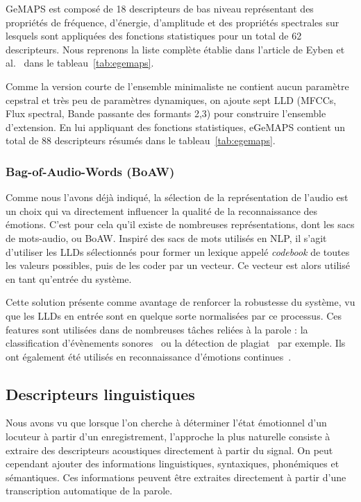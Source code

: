 GeMAPS est composé de 18 descripteurs de bas niveau représentant des propriétés de fréquence, d’énergie, d’amplitude et des propriétés spectrales sur lesquels sont appliquées des fonctions statistiques pour un total de 62 descripteurs.
Nous reprenons la liste complète établie dans l'article de Eyben et al.~\cite{Eyben2016} dans le tableau~\ref{tab:egemaps}.



Comme la version courte de l’ensemble minimaliste ne contient aucun paramètre cepstral et très peu de paramètres dynamiques, on ajoute sept LLD (MFCCs, Flux spectral, Bande passante des formants 2,3) pour construire l'ensemble d'extension. En lui appliquant des fonctions statistiques, eGeMAPS contient un total de 88 descripteurs résumés dans le tableau~\ref{tab:egemaps}.

\subsubsection{Bag-of-Audio-Words (BoAW)}
Comme nous l'avons déjà indiqué, la sélection de la représentation de l'audio est un choix qui va directement influencer la qualité de la reconnaissance des émotions. C'est pour cela qu'il existe de nombreuses représentations, dont les sacs de mots-audio, ou BoAW. Inspiré des sacs de mots utilisés en NLP, il s'agit d'utiliser les LLDs sélectionnés pour former un lexique appelé \textit{codebook} de toutes les valeurs possibles, puis de les coder par un vecteur. Ce vecteur est alors utilisé en tant qu'entrée du système.

Cette solution présente comme avantage de renforcer la robustesse du système, vu que les LLDs en entrée sont en quelque sorte normalisées par ce processus. Ces features sont utilisées dans de nombreuses tâches reliées à la parole : la classification d'évènements sonores~\cite{Pancoast2012,Schmitt2016} ou la détection de plagiat~\cite{Liu2010} par exemple. Ils ont également été utilisés en reconnaissance d'émotions continues~\cite{Schmitt2016,Han2018}. %

\subsection{Descripteurs linguistiques}
Nous avons vu que lorsque l'on cherche à déterminer l'état émotionnel d'un locuteur à partir d'un enregistrement, l'approche la plus naturelle consiste à extraire des descripteurs acoustiques directement à partir du signal. On peut cependant ajouter des informations linguistiques, syntaxiques, phonémiques et sémantiques. Ces informations peuvent être extraites directement à partir d'une transcription automatique de la parole.

